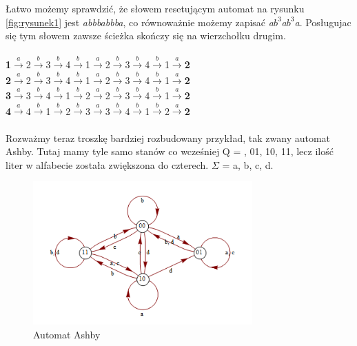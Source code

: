 \documentclass[12pt,a4paper]{article}
\begin{document}
{\L}atwo mo\.{z}emy sprawdzi\'{c}, \.{z}e s{\l}owem resetuj\k{a}cym automat na rysunku \ref{fig:rysunek1} jest \textit{abbbabbba}, co r\'{o}wnowa\.{z}nie mo\.{z}emy zapisa\'{c} \textit{a$b^{3}$a$b^{3}$a}. Pos{\l}ugujac si\k{e} tym s{\l}owem zawsze \'{s}cie\.{z}ka sko\'{n}czy si\k{e} na wierzcho{\l}ku drugim.\\
\\
\textbf{1}$\xrightarrow{a}$2$\xrightarrow{b}$3$\xrightarrow{b}$4$\xrightarrow{b}$1$\xrightarrow{a}$2$\xrightarrow{b}$3$\xrightarrow{b}$4$\xrightarrow{b}$1$\xrightarrow{a}$\textbf{2}\\
\textbf{2}$\xrightarrow{a}$2$\xrightarrow{b}$3$\xrightarrow{b}$4$\xrightarrow{b}$1$\xrightarrow{a}$2$\xrightarrow{b}$3$\xrightarrow{b}$4$\xrightarrow{b}$1$\xrightarrow{a}$\textbf{2}\\
\textbf{3}$\xrightarrow{a}$3$\xrightarrow{b}$4$\xrightarrow{b}$1$\xrightarrow{b}$2$\xrightarrow{a}$2$\xrightarrow{b}$3$\xrightarrow{b}$4$\xrightarrow{b}$1$\xrightarrow{a}$\textbf{2}\\
\textbf{4}$\xrightarrow{a}$4$\xrightarrow{b}$1$\xrightarrow{b}$2$\xrightarrow{b}$3$\xrightarrow{a}$3$\xrightarrow{b}$4$\xrightarrow{b}$1$\xrightarrow{b}$2$\xrightarrow{a}$\textbf{2}\\
\\


Rozwa\.{z}my teraz troszk\k{e} bardziej rozbudowany przyk{\l}ad, tak zwany automat Ashby. Tutaj mamy tyle samo stan\'{o}w co wcze\'{s}niej  Q = , 01, 10, 11\textbraceright, lecz ilo\'{s}\'{c} liter w alfabecie zosta{\l}a zwi\k{e}kszona do czterech. $\Sigma$ = \textbraceleft a, b, c, d\textbraceright.

\begin{figure}[h]
    \centering
    \includegraphics[width=0.75\textwidth]{rysunek2}
    \caption{Automat Ashby}
    \label{fig:rysunek2}
\end{figure}
\end{document}
